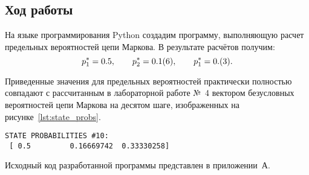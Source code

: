 \subsection{Ход работы}

На языке программирования Python создадим программу, выполняющую расчет
предельных вероятностей цепи Маркова. В результате расчётов получим:
\begin{equation*}
p_1^* = 0.5, \hspace{7mm} p_2^* = 0.1(6), \hspace{7mm} p_1^* = 0.(3).
\end{equation*}

Приведенные значения для предельных вероятностей практически полностью
совпадают с рассчитанным в лабораторной работе №~4 вектором безусловных вероятностей
цепи Маркова на десятом шаге, изображенных на рисунке~\ref{lst:state_probs}.

\begin{lstlisting}[caption=Вектор безусловных вероятностей перехода цепи Маркова \\
  на десятом шаге,label=lst:state_probs]
 STATE PROBABILITIES #10:
 [ 0.5         0.16669742  0.33330258]
\end{lstlisting}

Исходный код разработанной программы представлен в приложении~А.